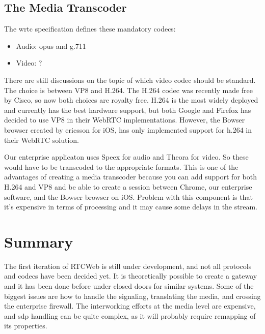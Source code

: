 \subsection{The Media Transcoder}
The \gls{wrtc} specification defines these mandatory codecs:
\begin{itemize}
    \item Audio: opus and g.711
    \item Video: ?
\end{itemize}

There are still discussions on the topic of which video codec should be standard. The choice is between VP8 and H.264. The H.264 codec was recently made free by Cisco, so now both choices are royalty free. H.264 is the most widely deployed and currently has the best hardware support, but both Google and Firefox has decided to use VP8 in their WebRTC implementations. However, the Bowser browser created by ericsson for iOS, has only implemented support for h.264 in their WebRTC solution.

Our enterprise applicaton uses Speex for audio and Theora for video. So these would have to be transcoded to the appropriate formats. This is one of the advantages of creating a media transcoder because you can add support for both H.264 and VP8 and be able to create a session between Chrome, our enterprise software, and the Bowser browser on iOS. Problem with this component is that it's expensive in terms of processing and it may cause some delays in the stream.

\section{Summary}
The first iteration of RTCWeb is still under development, and not all protocols and codecs have been decided yet. It is theoretically possible to create a gateway and it has been done before under closed doors for similar systems. Some of the biggest issues are how to handle the signaling, translating the media, and crossing the enterprise firewall. The interworking efforts at the media level are expensive, and \gls{sdp} handling can be quite complex, as it will probably require remapping of its properties.